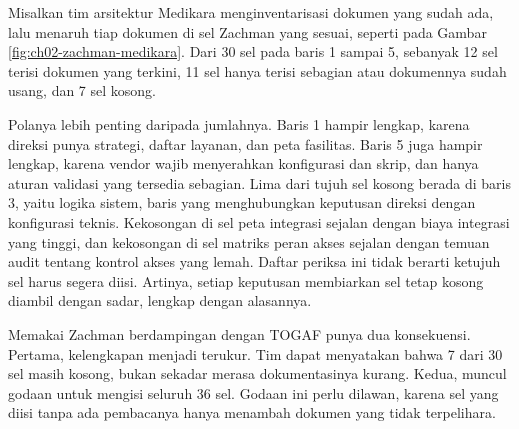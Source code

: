 \begin{kasus}[title={Kasus Medikara Health: Lemari Arsip yang Kosong di Tengah}]
\setlength{\parskip}{0.4em}
Misalkan tim arsitektur Medikara menginventarisasi dokumen yang sudah ada,
lalu menaruh tiap dokumen di sel Zachman yang sesuai, seperti pada
Gambar \ref{fig:ch02-zachman-medikara}. Dari 30 sel pada baris 1 sampai 5,
sebanyak 12 sel terisi dokumen yang terkini, 11 sel hanya terisi sebagian
atau dokumennya sudah usang, dan 7 sel kosong.

Polanya lebih penting daripada jumlahnya. Baris 1 hampir lengkap, karena
direksi punya strategi, daftar layanan, dan peta fasilitas. Baris 5 juga
hampir lengkap, karena vendor wajib menyerahkan konfigurasi dan skrip, dan
hanya aturan validasi yang tersedia sebagian. Lima dari
tujuh sel kosong berada di baris 3, yaitu logika sistem, baris yang
menghubungkan keputusan direksi dengan konfigurasi teknis. Kekosongan di sel
peta integrasi sejalan dengan biaya integrasi yang tinggi, dan kekosongan di
sel matriks peran akses sejalan dengan temuan audit tentang kontrol akses
yang lemah. Daftar periksa ini tidak berarti ketujuh sel harus segera
diisi. Artinya, setiap keputusan membiarkan sel tetap kosong diambil dengan
sadar, lengkap dengan alasannya.
\end{kasus}

Memakai Zachman berdampingan dengan TOGAF punya dua konsekuensi. Pertama,
kelengkapan menjadi terukur. Tim dapat menyatakan bahwa 7 dari 30 sel masih
kosong, bukan sekadar merasa dokumentasinya kurang. Kedua, muncul godaan
untuk mengisi seluruh 36 sel. Godaan ini perlu dilawan, karena sel yang diisi
tanpa ada pembacanya hanya menambah dokumen yang tidak terpelihara.

